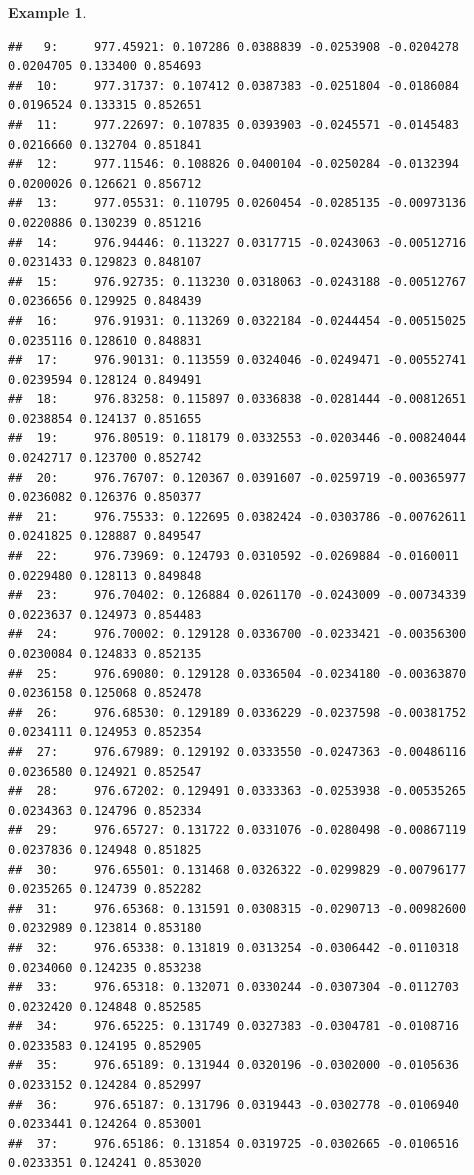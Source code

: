 \documentclass[
]{book}
\theoremstyle{definition}
\theoremstyle{definition}
\newtheorem{example}{Example}[chapter]
\theoremstyle{definition}
\theoremstyle{definition}
\theoremstyle{remark}
\begin{document}
\begin{example}
\begin{verbatim}
##   9:     977.45921: 0.107286 0.0388839 -0.0253908 -0.0204278 0.0204705 0.133400 0.854693
##  10:     977.31737: 0.107412 0.0387383 -0.0251804 -0.0186084 0.0196524 0.133315 0.852651
##  11:     977.22697: 0.107835 0.0393903 -0.0245571 -0.0145483 0.0216660 0.132704 0.851841
##  12:     977.11546: 0.108826 0.0400104 -0.0250284 -0.0132394 0.0200026 0.126621 0.856712
##  13:     977.05531: 0.110795 0.0260454 -0.0285135 -0.00973136 0.0220886 0.130239 0.851216
##  14:     976.94446: 0.113227 0.0317715 -0.0243063 -0.00512716 0.0231433 0.129823 0.848107
##  15:     976.92735: 0.113230 0.0318063 -0.0243188 -0.00512767 0.0236656 0.129925 0.848439
##  16:     976.91931: 0.113269 0.0322184 -0.0244454 -0.00515025 0.0235116 0.128610 0.848831
##  17:     976.90131: 0.113559 0.0324046 -0.0249471 -0.00552741 0.0239594 0.128124 0.849491
##  18:     976.83258: 0.115897 0.0336838 -0.0281444 -0.00812651 0.0238854 0.124137 0.851655
##  19:     976.80519: 0.118179 0.0332553 -0.0203446 -0.00824044 0.0242717 0.123700 0.852742
##  20:     976.76707: 0.120367 0.0391607 -0.0259719 -0.00365977 0.0236082 0.126376 0.850377
##  21:     976.75533: 0.122695 0.0382424 -0.0303786 -0.00762611 0.0241825 0.128887 0.849547
##  22:     976.73969: 0.124793 0.0310592 -0.0269884 -0.0160011 0.0229480 0.128113 0.849848
##  23:     976.70402: 0.126884 0.0261170 -0.0243009 -0.00734339 0.0223637 0.124973 0.854483
##  24:     976.70002: 0.129128 0.0336700 -0.0233421 -0.00356300 0.0230084 0.124833 0.852135
##  25:     976.69080: 0.129128 0.0336504 -0.0234180 -0.00363870 0.0236158 0.125068 0.852478
##  26:     976.68530: 0.129189 0.0336229 -0.0237598 -0.00381752 0.0234111 0.124953 0.852354
##  27:     976.67989: 0.129192 0.0333550 -0.0247363 -0.00486116 0.0236580 0.124921 0.852547
##  28:     976.67202: 0.129491 0.0333363 -0.0253938 -0.00535265 0.0234363 0.124796 0.852334
##  29:     976.65727: 0.131722 0.0331076 -0.0280498 -0.00867119 0.0237836 0.124948 0.851825
##  30:     976.65501: 0.131468 0.0326322 -0.0299829 -0.00796177 0.0235265 0.124739 0.852282
##  31:     976.65368: 0.131591 0.0308315 -0.0290713 -0.00982600 0.0232989 0.123814 0.853180
##  32:     976.65338: 0.131819 0.0313254 -0.0306442 -0.0110318 0.0234060 0.124235 0.853238
##  33:     976.65318: 0.132071 0.0330244 -0.0307304 -0.0112703 0.0232420 0.124848 0.852585
##  34:     976.65225: 0.131749 0.0327383 -0.0304781 -0.0108716 0.0233583 0.124195 0.852905
##  35:     976.65189: 0.131944 0.0320196 -0.0302000 -0.0105636 0.0233152 0.124284 0.852997
##  36:     976.65187: 0.131796 0.0319443 -0.0302778 -0.0106940 0.0233441 0.124264 0.853001
##  37:     976.65186: 0.131854 0.0319725 -0.0302665 -0.0106516 0.0233351 0.124241 0.853020

\end{verbatim}
\end{example}
\end{document}
